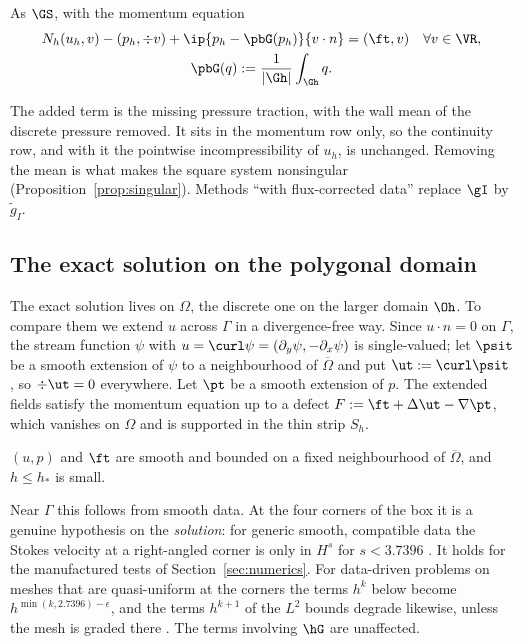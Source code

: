 \begin{definition}\label{def:cns}
As $\GS$, with the momentum equation
\begin{gather*}
N_h(u_h,v)-(p_h,\div v)+\ip{p_h-\pbG(p_h)}{v\cdot n}=(\ft,v)\quad\forall v\in\VR,\\
\pbG(q):=\frac1{|\Gh|}\int_{\Gh}q .
\end{gather*}
\end{definition}
The added term is the missing pressure traction, with the wall mean of the discrete pressure removed. It sits in the momentum row only, so the continuity row, and with it the pointwise incompressibility of $u_h$, is unchanged. Removing the mean is what makes the square system nonsingular (Proposition~\ref{prop:singular}). Methods ``with flux-corrected data'' replace $\gI$ by $\tilde g_I$.

\subsection{The exact solution on the polygonal domain}
The exact solution lives on $\Omega$, the discrete one on the larger domain $\Oh$. To compare them we extend $u$ across $\Gamma$ in a divergence-free way. Since $u\cdot n=0$ on $\Gamma$, the stream function $\psi$ with $u=\curl\psi=(\partial_y\psi,-\partial_x\psi)$ is single-valued; let $\psit$ be a smooth extension of $\psi$ to a neighbourhood of $\overline\Omega$ and put $\ut:=\curl\psit$, so $\div\ut=0$ everywhere. Let $\pt$ be a smooth extension of $p$. The extended fields satisfy the momentum equation up to a defect $F:=\ft+\Delta\ut-\nabla\pt$, which vanishes on $\Omega$ and is supported in the thin strip $S_h$.

\begin{assumption}\label{ass:D}
$(u,p)$ and $\ft$ are smooth and bounded on a fixed neighbourhood of $\overline\Omega$, and $h\le h_\ast$ is small.
\end{assumption}
Near $\Gamma$ this follows from smooth data. At the four corners of the box it is a genuine hypothesis on the \emph{solution}: for generic smooth, compatible data the Stokes velocity at a right-angled corner is only in $H^s$ for $s<3.7396$ \cite{Dauge1989}. It holds for the manufactured tests of Section~\ref{sec:numerics}. For data-driven problems on meshes that are quasi-uniform at the corners the terms $h^k$ below become $h^{\min(k,2.7396)-\epsilon}$, and the terms $h^{k+1}$ of the $L^2$ bounds degrade likewise, unless the mesh is graded there \cite{PadhiExt}. The terms involving $\hG$ are unaffected.

